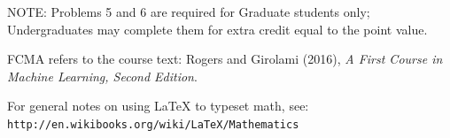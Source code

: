 \documentclass[10pt]{article}
\newcommand{\latex}{\LaTeX\xspace}
\begin{document}

NOTE: Problems 5 and 6 are required for Graduate students only; Undergraduates may complete them for extra credit equal to the point value.

FCMA refers to the course text: Rogers and Girolami (2016), {\em A First Course in Machine Learning, Second Edition}.  

For general notes on using \latex to typeset math, see: {\tt http://en.wikibooks.org/wiki/LaTeX/Mathematics}
\vspace{.5cm}

\end{document}
